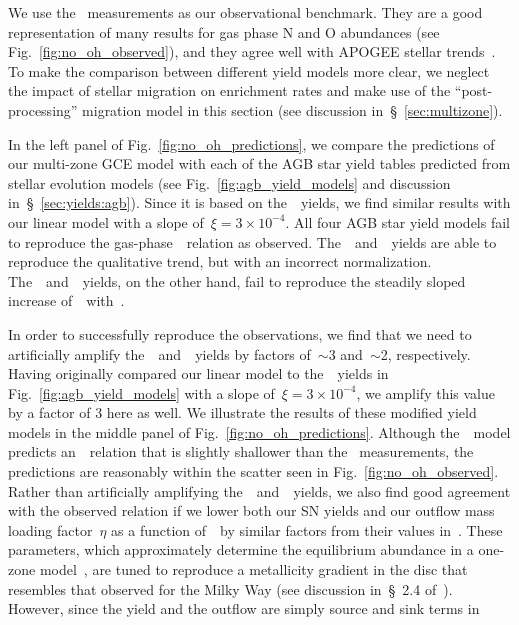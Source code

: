 \documentclass[ms.tex]{subfiles}
\begin{document}
We use the~\citet{Dopita2016} measurements as our observational benchmark.
They are a good representation of many results for gas phase N and O abundances
(see Fig.~\ref{fig:no_oh_observed}), and they agree well with APOGEE stellar
trends~\citep{Vincenzo2021}.
To make the comparison between different yield models more clear, we neglect
the impact of stellar migration on enrichment rates and make use of the
``post-processing'' migration model in this section (see discussion
in~\S~\ref{sec:multizone}).
\par
In the left panel of Fig.~\ref{fig:no_oh_predictions}, we compare the
predictions of our multi-zone GCE model with each of the AGB star yield tables
predicted from stellar evolution models (see Fig.~\ref{fig:agb_yield_models}
and discussion in~\S~\ref{sec:yields:agb}).
Since it is based on the~\cristallo~yields, we find similar results with our
linear model with a slope of~$\xi = 3\times10^{-4}$.
All four AGB star yield models fail to reproduce the gas-phase~\ohno~relation
as observed.
The~\cristallo~and~\ventura~yields are able to reproduce the qualitative trend,
but with an incorrect normalization.
The~\karakasten~and~\karakas~yields, on the other hand, fail to reproduce
the steadily sloped increase of~\no~with~\oh.
\par
In order to successfully reproduce the observations, we find that we need to
artificially amplify the~\cristallo~and~\ventura~yields by factors of~$\sim$3
and~$\sim$2, respectively.
Having originally compared our linear model to the~\cristallo~yields in
Fig.~\ref{fig:agb_yield_models} with a slope of~$\xi = 3\times10^{-4}$, we
amplify this value by a factor of 3 here as well.
We illustrate the results of these modified yield models in the middle panel
of Fig.~\ref{fig:no_oh_predictions}.
Although the~\ventura~model predicts an~\ohno~relation that is slightly
shallower than the~\citet{Dopita2016} measurements, the predictions are
reasonably within the scatter seen in Fig.~\ref{fig:no_oh_observed}.
Rather than artificially amplifying the~\cristallo~and~\ventura~yields, we also
find good agreement with the observed relation if we lower both our SN yields
and our outflow mass loading factor~$\eta$ as a function of~\rgal~by similar
factors from their values in~\citet{Johnson2021}.
These parameters, which approximately determine the equilibrium abundance in a
one-zone model~\citep{Weinberg2017}, are tuned to reproduce a metallicity
gradient in the disc that resembles that observed for the Milky Way (see
discussion in~\S~2.4 of~\citealp{Johnson2021}).
However, since the yield and the outflow are simply source and sink terms in
\end{document}
